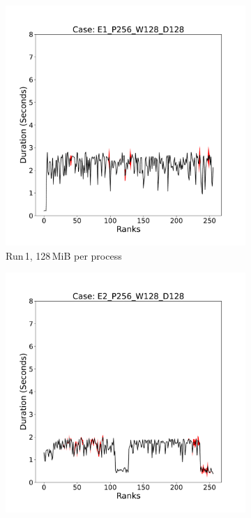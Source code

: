 \begin{figure}
     \centering
     \begin{subfigure}[b]{0.3\textwidth}
         \centering
         \includegraphics[width=\textwidth, height=\textwidth]{figures/E1_P256_W128_D128.pdf}
         \caption{Run\,1, 128\,MiB per process}
         \label{fig:E1_128}
     \end{subfigure}
     \hfill
     \begin{subfigure}[b]{0.3\textwidth}
         \centering
         \includegraphics[width=\textwidth, height=\textwidth]{figures/E2_P256_W128_D128.pdf}

\end{subfigure}
\end{figure}
